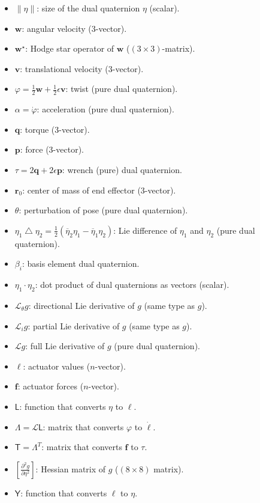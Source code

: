 \documentclass[reqno,12pt]{amsart}
\newcommand\starop[1]{#1^\star}
\newcommand{\liediff}{\mathbin{\triangle}}
\newcommand{\liederiv}{\mathcal L}
\begin{document}
\begin{itemize}
\item $\|\eta\|$: size of the dual quaternion $\eta$ (scalar).
\item $\bm w$: angular velocity (3-vector).
\item $\starop{\bm w}$: Hodge star operator of $\bm w$ ($(3\times3)$-matrix).
\item $\bm v$: translational velocity (3-vector).
\item $\varphi = \frac12\bm w + \frac12\epsilon \bm v$: twist (pure dual quaternion).
\item $\alpha = \dot\varphi$: acceleration (pure dual quaternion).
\item $\bm q$: torque (3-vector).
\item $\bm p$: force (3-vector).
\item $\tau = 2\bm q + 2 \epsilon \bm p$: wrench (pure) dual quaternion.
\item $\bm r_0$: center of mass of end effector (3-vector).
\item $\theta$: perturbation of pose (pure dual quaternion).
\item $\eta_1 \liediff \eta_2 = \tfrac12(\overline\eta_2\eta_1 - \overline\eta_1 \eta_2)$: Lie difference of $\eta_1$ and $\eta_2$ (pure dual quaternion).
\item $\beta_i$: basis element dual quaternion.
\item $\eta_1 \cdot \eta_2$: dot product of dual quaternions as vectors (scalar).
\item $\liederiv_\theta g$: directional Lie derivative of $g$ (same type as $g$).
\item $\liederiv_i g$: partial Lie derivative of $g$ (same type as $g$).
\item $\liederiv g$: full Lie derivative of $g$ (pure dual quaternion).
\item $\bm \ell$: actuator values ($n$-vector).
\item $\bm f$: actuator forces ($n$-vector).
\item $\mathsf L$: function that converts $\eta$ to $\bm \ell$.
\item $\mathsf \Lambda = \liederiv\mathsf L$: matrix that converts $\varphi$ to $\dot{\bm \ell}$.
\item $\mathsf T = \mathsf\Lambda^T$: matrix that converts $\bm f$ to $\tau$.
\item $\left[\frac{\partial^2g}{\partial\eta^2}\right]$: Hessian matrix of $g$ ($(8 \times 8)$ matrix).
\item $\mathsf Y$: function that converts $\bm\ell$ to $\eta$.

\end{itemize}
\end{document}
